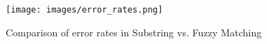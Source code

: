 \begin{figure}[ht]
    \centering
    \texttt{[image: images/error\_rates.png]}
    \caption{Comparison of error rates in Substring vs. Fuzzy Matching }
    \label{fig:error_rates}
\end{figure}